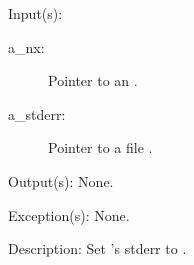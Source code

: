 \begin{capi}
\begin{capilist}
	\item[Input(s): ]
		\begin{description}\item[]
		\item[a\_nx: ]
			Pointer to an .
		\item[a\_stderr: ]
			Pointer to a file .
		\end{description}
	\item[Output(s): ] None.
	\item[Exception(s): ] None.
	\item[Description: ]
		Set 's stderr to .
	\end{capilist}
\end{capi}
